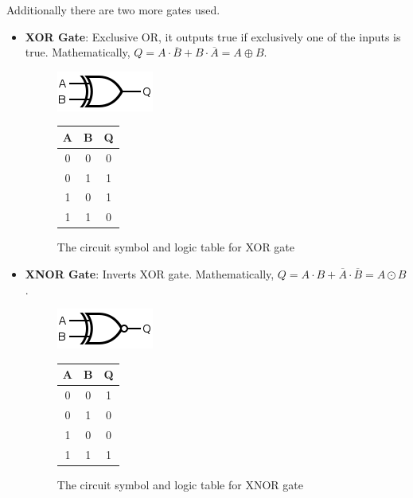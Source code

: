 \noindent Additionally there are two more gates used.\\

\begin{itemize}

    \item \textbf{XOR Gate}: Exclusive OR, it outputs true if exclusively one of the inputs is true. Mathematically, $Q=A \cdot \overline{B} + B \cdot \overline{A} = A \oplus B$.
        
    \begin{figure}[H]
        \centering
        \includegraphics[width=0.30\columnwidth]{images/xor.png}
        \qquad
        \begin{tabular}[b]{|c|c|c|}\hline
        A & B & Q \\ \hline
        0 & 0 & 0 \\ 
        0 & 1 & 1 \\
        1 & 0 & 1 \\
        1 & 1 & 0 \\ \hline
        \end{tabular}
        \caption{The circuit symbol and logic table for XOR gate}
    \end{figure}

    \item \textbf{XNOR Gate}: Inverts XOR gate. Mathematically, $Q=A \cdot B + \overline{A} \cdot \overline{B} = A \odot B$.
        
    \begin{figure}[H]
        \centering
        \includegraphics[width=0.30\columnwidth]{images/xnor.png}
        \qquad
        \begin{tabular}[b]{|c|c|c|}\hline
        A & B & Q \\ \hline
        0 & 0 & 1 \\ 
        0 & 1 & 0 \\
        1 & 0 & 0 \\
        1 & 1 & 1 \\ \hline
        \end{tabular}
        \caption{The circuit symbol and logic table for XNOR gate}
    \end{figure}
    
\end{itemize}

